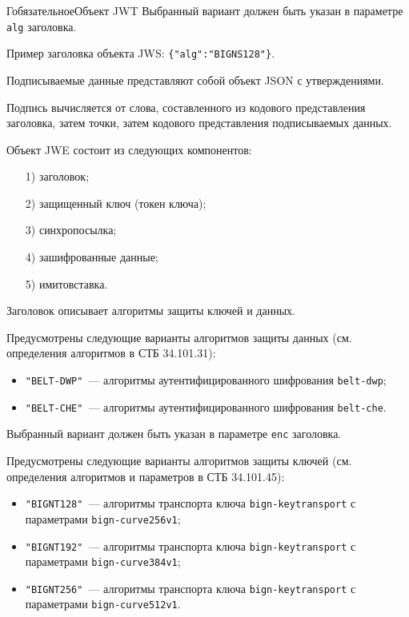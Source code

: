 \begin{appendix}{Г}{обязательное}{Объект JWT}
Выбранный вариант должен быть указан в параметре \lstinline{alg} заголовка.

Пример заголовка объекта JWS: \lstinline|{"alg":"BIGNS128"}|.

Подписываемые данные представляют собой объект JSON с утверждениями. 

Подпись вычисляется от слова, составленного из кодового представления 
заголовка, затем точки, затем кодового представления подписываемых данных. 


Объект JWE состоит из следующих компонентов:
\begin{enumerate}
\item[1)] 
заголовок;
\item[2)] 
защищенный ключ (токен ключа);
\item[3)] 
синхропосылка;
\item[4)]
зашифрованные данные;
\item[5)]
имитовставка.
\end{enumerate}

Заголовок описывает алгоритмы защиты ключей и данных.

Предусмотрены следующие варианты алгоритмов защиты данных
(см. определения алгоритмов в СТБ 34.101.31):
\begin{itemize}
\item
\lstinline{"BELT-DWP"}~--- алгоритмы аутентифицированного шифрования 
\lstinline{belt-dwp}; 
\item
\lstinline{"BELT-CHE"}~--- алгоритмы аутентифицированного шифрования 
\lstinline{belt-che}.
\end{itemize}

Выбранный вариант должен быть указан в параметре \lstinline{enc} заголовка.

Предусмотрены следующие варианты алгоритмов защиты ключей
(см. определения алгоритмов и параметров в СТБ 34.101.45):
\begin{itemize}
\item
\lstinline{"BIGNT128"}~--- алгоритмы транспорта ключа 
\lstinline{bign-keytransport} с параметрами \lstinline{bign-curve256v1};
\item
\lstinline{"BIGNT192"}~--- алгоритмы транспорта ключа 
\lstinline{bign-keytransport} с параметрами \lstinline{bign-curve384v1};
\item
\lstinline{"BIGNT256"}~--- алгоритмы транспорта ключа 
\lstinline{bign-keytransport} с параметрами \lstinline{bign-curve512v1}. 
\end{itemize}


\end{appendix}
